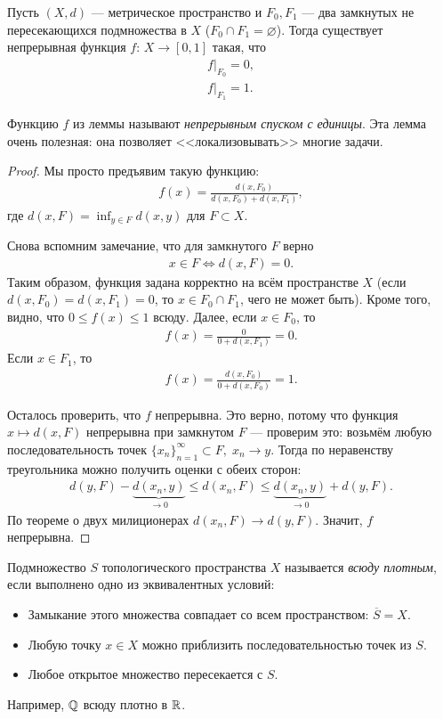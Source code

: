 \begin{lm}[Урысона]
 \label{lemma:urison_metric_space}
 Пусть $(X, d)$ --- метрическое пространство и  $F_0, F_1$ --- два замкнутых не пересекающихся подмножества в $X$ ($F_0 \cap F_1 = \varnothing$). Тогда существует непрерывная функция $f \colon\, X \to [0,1] $ такая, что \begin{align*}
  f \rvert_{F_0} = 0, \\
  f \rvert_{F_1} = 1
.\end{align*}
\end{lm}

Функцию $f$ из леммы называют \textit{непрерывным спуском с единицы}. Эта лемма очень полезная: она позволяет <<локализовывать>> многие задачи.

\begin{proof}
 Мы просто предъявим такую функцию: \begin{align*}
  f(x) = \frac{d(x, F_0)}{d(x, F_0) + d(x, F_1)}
 ,\end{align*}  где $d(x, F) = \inf_{y \in F} d(x, y)$ для $F \subset X$.

 Снова вспомним замечание, что для замкнутого $F$ верно \begin{align*}
  x \in F \iff d(x, F) = 0
 .\end{align*} Таким образом, функция задана корректно на всём пространстве $X$ (если $d(x, F_0) = d(x, F_1) = 0$, то $x \in F_0 \cap F_1$, чего не может быть). Кроме того, видно, что $0 \leqslant f(x) \leqslant 1$ всюду. Далее, если $x \in F_0$, то 
\begin{align*}
f(x) = \frac{0}{0 + d(x,F_1)} = 0
.\end{align*} Если  $x \in F_1$, то 
\begin{align*}
f(x) = \frac{d(x, F_0)}{0 + d(x, F_0)} = 1
.\end{align*}

 Осталось проверить, что $f$ непрерывна. Это верно, потому что функция $x \mapsto d(x, F)$ непрерывна при замкнутом $F$ --- проверим это: возьмём любую последовательность точек $\{x_{n}\}_{n=1}^{\infty} \subset F,\; x_n \to y$. Тогда по неравенству треугольника можно получить оценки с обеих сторон: \begin{align*}
  d(y, F) - \underbrace{d(x_n, y)}_{\to 0} \leqslant d(x_n, F) \leqslant \underbrace{d(x_n, y)}_{\to 0} + d(y, F) 
 .\end{align*} По теореме о двух милиционерах $d(x_n, F) \to d(y, F)$. Значит, $f$ непрерывна.
\end{proof}
\begin{df*}
 Подмножество $S$ топологического пространства $X$ называется \textit{всюду плотным}, если выполнено одно из эквивалентных условий:
 \begin{itemize}
  \item Замыкание этого множества совпадает со всем пространством: $\overline S = X$.
  \item Любую точку $x \in X$ можно приблизить последовательностью точек из $S$.
  \item Любое открытое множество пересекается с $S$.
 \end{itemize}
\end{df*}
Например, $\mathbb{Q}$ всюду плотно в $\mathbb{R}$.


